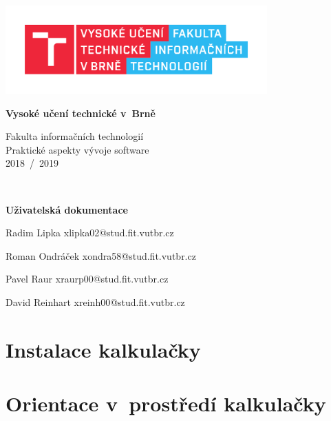 \documentclass[12pt]{article}
\begin{document}
\begin{titlepage}
	\begin{center}

		\includegraphics[height = 96pt]{img/FIT_barevne_CMYK_CZ.pdf} \\

		\begin{LARGE}
			\textbf{Vysoké učení technické v~Brně} \\
		\end{LARGE}

		\begin{large}
			Fakulta informačních technologií \\
			Praktické aspekty vývoje software \\
			2018~/~2019 
		\end{large}
		\\[78mm]

		\begin{huge}
				\textbf{Uživatelská dokumentace} \\
			\begin{large}		
		Radim Lipka xlipka02@stud.fit.vutbr.cz
		
        Roman Ondráček xondra58@stud.fit.vutbr.cz
        
        Pavel Raur xraurp00@stud.fit.vutbr.cz
        
        David Reinhart xreinh00@stud.fit.vutbr.cz
        \end{large}
		\end{huge}
	\end{center}

	\vfill


\end{titlepage}

\tableofcontents
\newpage

\section{Instalace kalkulačky}
\section{Orientace v~prostředí kalkulačky}
\end{document}
